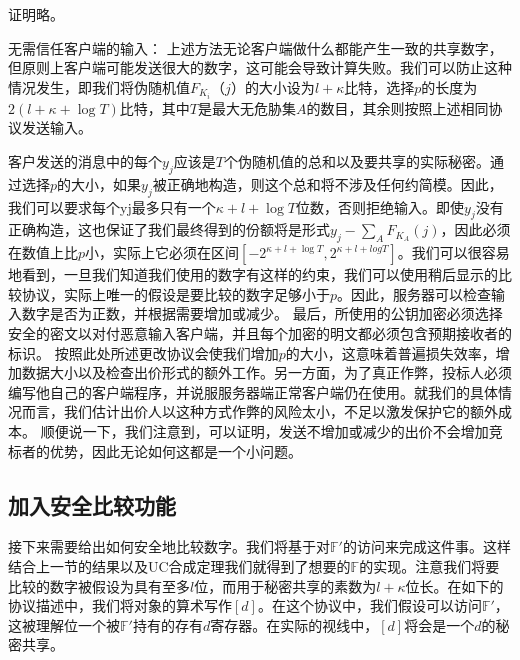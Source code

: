 证明略。

{\heiti 无需信任客户端的输入：} 上述方法无论客户端做什么都能产生一致的共享数字，但原则上客户端可能发送很大的数字，这可能会导致计算失败。我们可以防止这种情况发生，即我们将伪随机值$F_{K_i}（j）$的大小设为$l+\kappa$比特，选择$p$的长度为$2(l+\kappa+\log T)$比特，其中$T$是最大无危胁集$A$的数目，其余则按照上述相同协议发送输入。

客户发送的消息中的每个$y_j$应该是$T$个伪随机值的总和以及要共享的实际秘密。通过选择$p$的大小，如果$y_j$被正确地构造，则这个总和将不涉及任何约简模。因此，我们可以要求每个yj最多只有一个$\kappa+l+\log T$位数，否则拒绝输入。即使$y_j$没有正确构造，这也保证了我们最终得到的份额将是形式$y_j-\sum_{A}F_{K_A}(j)$，因此必须在数值上比$p$小，实际上它必须在区间$[-2^{\kappa+l+\log T},2^{\kappa+l+log T}]$。我们可以很容易地看到，一旦我们知道我们使用的数字有这样的约束，我们可以使用稍后显示的比较协议，实际上唯一的假设是要比较的数字足够小于$p$。因此，服务器可以检查输入数字是否为正数，并根据需要增加或减少。
最后，所使用的公钥加密必须选择安全的密文以对付恶意输入客户端，并且每个加密的明文都必须包含预期接收者的标识。
按照此处所述更改协议会使我们增加$p$的大小，这意味着普遍损失效率，增加数据大小以及检查出价形式的额外工作。另一方面，为了真正作弊，投标人必须编写他自己的客户端程序，并说服服务器端正常客户端仍在使用。就我们的具体情况而言，我们估计出价人以这种方式作弊的风险太小，不足以激发保护它的额外成本。
顺便说一下，我们注意到，可以证明，发送不增加或减少的出价不会增加竞标者的优势，因此无论如何这都是一个小问题。

\subsection{加入安全比较功能}
接下来需要给出如何安全地比较数字。我们将基于对$\mathbb{F}'$的访问来完成这件事。这样结合上一节的结果以及UC合成定理我们就得到了想要的$\mathbb{F}$的实现。注意我们将要比较的数字被假设为具有至多$l$位，而用于秘密共享的素数为$l+\kappa$位长。在如下的协议描述中，我们将对象的算术写作$[d]$。在这个协议中，我们假设可以访问$\mathbb{F}'$，这被理解位一个被$\mathbb{F}'$持有的存有$d$寄存器。在实际的视线中，$[d]$将会是一个$d$的秘密共享。

